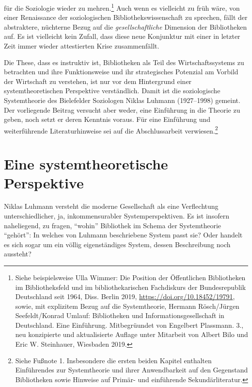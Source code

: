 \documentclass[a4paper,
fontsize=11pt,
oneside,
numbers=noperiodatend,
parskip=half-,
bibliography=totoc,
final
]{scrartcl}
\begin{document}
für die Soziologie wieder zu mehren.\footnote{Siehe beispielsweise Ulla
  Wimmer: Die Position der Öffentlichen Bibliotheken im Bibliotheksfeld
  und im bibliothekarischen Fachdiskurs der Bundesrepublik Deutschland
  seit 1964, Diss. Berlin 2019, \url{https://doi.org/10.18452/19791},
  sowie, mit explizitem Bezug auf die Systemtheorie, Hermann
  Rösch/Jürgen Seefeldt/Konrad Umlauf: Bibliotheken und
  Informationsgesellschaft in Deutschland. Eine Einführung.
  Mitbegrüundet von Engelbert Plassmann. 3., neu konzipierte und
  aktualisierte Auflage unter Mitarbeit von Albert Bilo und Eric W.
  Steinhauer, Wiesbaden 2019.} Auch wenn es vielleicht zu früh wäre, von
einer Renaissance der soziologischen Bibliothekswissenschaft zu
sprechen, fällt der abstraktere, nüchterne Bezug auf die
\emph{gesellschaftliche} Dimension der Bibliotheken auf. Es ist
vielleicht kein Zufall, dass diese neue Konjunktur mit einer in letzter
Zeit immer wieder attestierten Krise zusammenfällt.

Die These, dass es instruktiv ist, Bibliotheken als Teil des
Wirtschaftssystems zu betrachten und ihre Funktionsweise und ihr
strategisches Potenzial am Vorbild der Wirtschaft zu verstehen, ist nur
vor dem Hintergrund einer systemtheoretischen Perspektive verständlich.
Damit ist die soziologische Systemtheorie des Bielefelder Soziologen
Niklas Luhmann (1927--1998) gemeint. Der vorliegende Beitrag versucht
aber weder, eine Einführung in die Theorie zu geben, noch setzt er deren
Kenntnis voraus. Für eine Einführung und weiterführende
Literaturhinweise sei auf die Abschlussarbeit verwiesen.\footnote{Siehe
  Fußnote 1. Insbesondere die ersten beiden Kapitel enthalten
  Einführendes zur Systemtheorie und ihrer Anwendbarkeit auf den
  Gegenstand Bibliotheken sowie Hinweise auf Primär- und einführende
  Sekundärliteratur.}


\hypertarget{eine-systemtheoretische-perspektive}{%
\section{Eine systemtheoretische
Perspektive}\label{eine-systemtheoretische-perspektive}}

Niklas Luhmann versteht die moderne Gesellschaft als eine Verflechtung
unterschiedlicher, ja, inkommensurabler Systemperspektiven. Es ist
insofern naheliegend, zu fragen, \enquote{wohin} Bibliothek im Schema
der Systemtheorie \enquote{gehört}: In welches von Luhmann beschriebene
System passt sie? Oder handelt es sich sogar um ein völlig
eigenständiges System, dessen Beschreibung noch aussteht?
\end{document}
